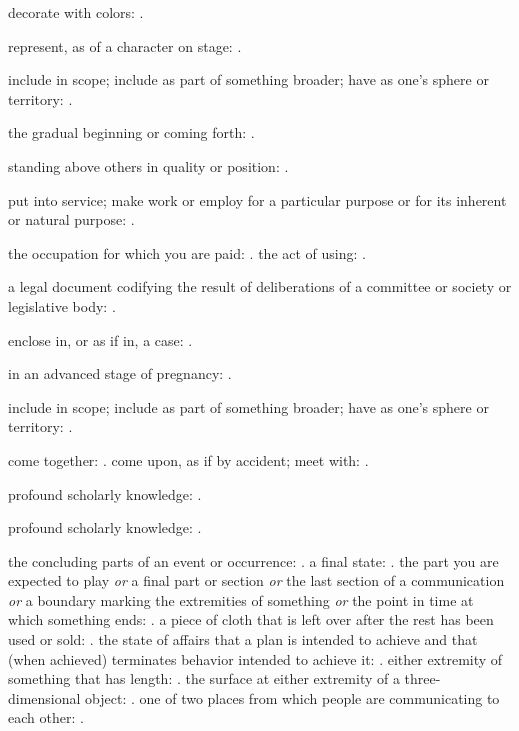   decorate with colors: .

  represent, as of a character on stage: .

  include in scope; include as part of something broader; have as one's sphere or territory: .

  the gradual beginning or coming forth: .

  standing above others in quality or position: .

  put into service; make work or employ for a particular purpose or for its inherent or natural purpose: .

  the occupation for which you are paid: . the act of using: .

  a legal document codifying the result of deliberations of a committee or society or legislative body: .

  enclose in, or as if in, a case: .

  in an advanced stage of pregnancy: .

  include in scope; include as part of something broader; have as one's sphere or territory: .

  come together: . come upon, as if by accident; meet with: .

  profound scholarly knowledge: .

  profound scholarly knowledge: .

  the concluding parts of an event or occurrence: . a final state: . the part you are expected to play \textit{or} a final part or section \textit{or} the last section of a communication \textit{or} a boundary marking the extremities of something \textit{or} the point in time at which something ends: . a piece of cloth that is left over after the rest has been used or sold: . the state of affairs that a plan is intended to achieve and that (when achieved) terminates behavior intended to achieve it: . either extremity of something that has length: . the surface at either extremity of a three-dimensional object: . one of two places from which people are communicating to each other: .


